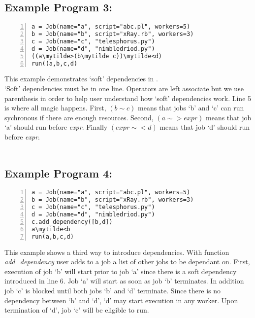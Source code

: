 \subsection*{Example Program 3:}
\begin{Verbatim}[numbers=left,commandchars=\\\{\}]
a = Job(name="a", script="abc.pl", workers=5)
b = Job(name="b", script="xRay.rb", workers=3)
c = Job(name="c", "telesphorus.py")
d = Job(name="d", "nimbledriod.py")
((a\mytilde>(b\mytilde c))\mytilde<d)
run((a,b,c,d)
\end{Verbatim}

This example demonstrates `soft' dependencies in \lang{}.\\
`Soft' dependencies must be in one line. Operators
are left associate but we use parenthesis in order to help
user understand how `soft' dependencies work. Line 5 is where all
magic happens. First, $(b\sim c)$ means that jobs `b' and `c' can run 
sychronous if there are enough resources. Second,
$(a\sim>expr)$ means that job `a' should run before \textit{expr}. 
Finally $(expr\sim<d)$ means that job `d' should run before \textit{expr}.\\
\\

\subsection*{Example Program 4:}
\begin{Verbatim}[numbers=left,commandchars=\\\{\}]
a = Job(name="a", script="abc.pl", workers=5)
b = Job(name="b", script="xRay.rb", workers=3)
c = Job(name="c", "telesphorus.py")
d = Job(name="d", "nimbledriod.py")
c.add_dependency([b,d])
a\mytilde<b
run(a,b,c,d)
\end{Verbatim}

This example shows a third way to introduce dependencies.
With function \textit{add\_dependency} user adds to a job
a list of other jobs to be dependant on. First, execution of job `b' 
will start prior to job `a' since there is a soft dependency introduced 
in line 6. Job `a' will start as soon as job `b' terminates.
In addition job `c' is blocked until both jobs `b' and `d' terminate.
Since there is no dependency between `b' and `d', `d' may start execution  
in any worker. Upon termination of `d', job `c' will be eligible to run.
